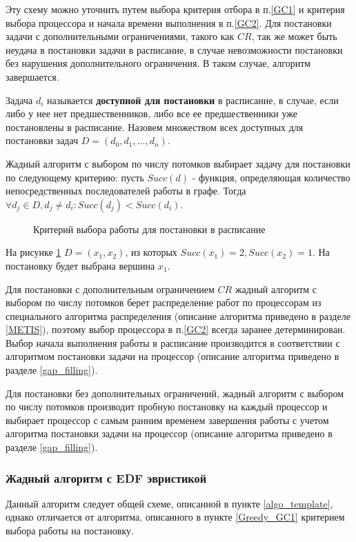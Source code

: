 Эту схему можно уточнить путем выбора критерия отбора в п.\ref{GC1} и критерия выбора процессора и начала времени выполнения в п.\ref{GC2}. Для постановки задачи с дополнительными ограничениями, такого как $CR$, так же может быть неудача в постановки задачи в расписание, в случае невозможности постановки без нарушения дополнительного ограничения. В таком случае, алгоритм завершается.

Задача $d_i$ называется \textbf{доступной для постановки} в расписание, в случае, если либо у нее нет предшественников, либо все ее предшественники уже постановлены в расписание. Назовем множеством всех доступных для постановки задач $D = \left( d_0, d_1, \ldots, d_n \right)$.

Жадный алгоритм с выбором по числу потомков выбирает задачу для постановки по следующему критерию: пусть $Succ(d)$ - функция, определяющая количество непосредственных последователей работы в графе. Тогда $\forall d_j \in D, d_j \neq d_i: Succ(d_j) < Succ(d_i)$.

\begin{figure}[!htbp]
    \caption{Критерий выбора работы для постановки в расписание}
    \label{fig:max-children}
\end{figure}
На рисунке \ref{fig:max-children} $D = \left( x_1, x_2 \right)$, из которых $Succ(x_1) = 2, Succ(x_2) = 1$. На постановку будет выбрана вершина $x_1$.

Для постановки с дополнительным ограничением $CR$ жадный алгоритм с выбором по числу потомков берет распределение работ по процессорам из специального алгоритма распределения (описание алгоритма приведено в разделе \ref{METIS}), поэтому выбор процессора в п.\ref{GC2} всегда заранее детерминирован. Выбор начала выполнения работы в расписание производится в соответствии с алгоритмом постановки задачи на процессор (описание алгоритма приведено в разделе \ref{gap_filling}).

Для постановки без дополнительных ограничений, жадный алгоритм с выбором по числу потомков производит пробную постановку на каждый процессор и выбирает процессор с самым ранним временем завершения работы с учетом алгоритма постановки задачи на процессор (описание алгоритма приведено в разделе \ref{gap_filling}).

\subsubsection{Жадный алгоритм с EDF эвристикой} \label{Greedy_EDF}
Данный алгоритм следует общей схеме, описанной в пункте \ref{algo_template}, однако отличается от алгоритма, описанного в пункте \ref{Greedy_GC1} критерием выбора работы на постановку.

